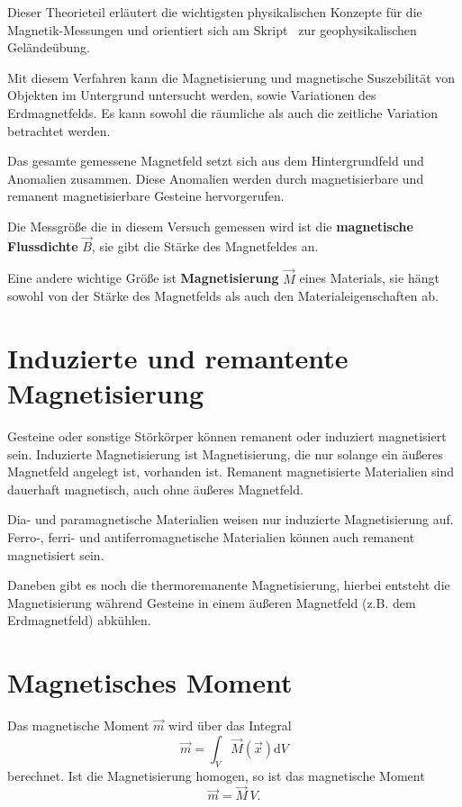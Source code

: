 Dieser Theorieteil erläutert die wichtigsten physikalischen Konzepte für die Magnetik-Messungen und orientiert sich am Skript~\cite{skript} zur geophysikalischen Geländeübung.

Mit diesem Verfahren kann die Magnetisierung und magnetische Suszebilität von Objekten im Untergrund untersucht werden, sowie Variationen des Erdmagnetfelds. Es kann sowohl die räumliche als auch die zeitliche Variation 
betrachtet werden.

Das gesamte gemessene Magnetfeld setzt sich aus dem Hintergrundfeld und Anomalien zusammen. Diese Anomalien 
 werden durch magnetisierbare und remanent magnetisierbare Gesteine hervorgerufen. 

Die Messgröße die in diesem Versuch gemessen wird ist die \textbf{magnetische Flussdichte} $\vec{B}$, sie gibt die Stärke des Magnetfeldes an.

Eine andere wichtige Größe ist \textbf{Magnetisierung} $\vec{M}$ eines Materials, sie hängt sowohl von der Stärke des Magnetfelds als auch den Materialeigenschaften ab.

\section{Induzierte und remantente Magnetisierung}
Gesteine oder sonstige Störkörper können remanent oder induziert magnetisiert sein. Induzierte Magnetisierung ist Magnetisierung, die nur solange ein äußeres Magnetfeld angelegt ist, vorhanden ist. Remanent magnetisierte 
Materialien sind dauerhaft magnetisch, auch ohne äußeres Magnetfeld.

Dia- und paramagnetische Materialien weisen nur induzierte Magnetisierung auf. Ferro-, ferri- und antiferromagnetische Materialien können auch remanent magnetisiert sein.

Daneben gibt es noch die thermoremanente Magnetisierung, hierbei entsteht die Magnetisierung während Gesteine in einem äußeren Magnetfeld (z.B. dem Erdmagnetfeld) abkühlen.


\section{Magnetisches Moment}
Das magnetische Moment $\vec{m}$  wird über das Integral
\begin{equation}
\vec{m}  = \int_V \vec{M}(\vec{x}) \text{d}V
\end{equation}
berechnet.
Ist die Magnetisierung homogen, so ist das magnetische Moment
\begin{equation}
\vec{m}  = \vec{M} \,V.
\end{equation}

